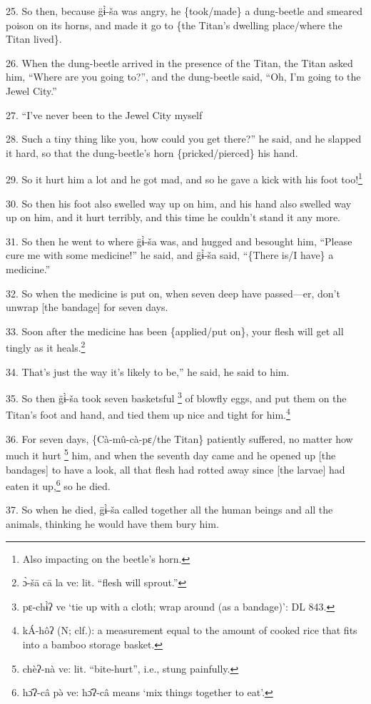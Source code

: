 25. So then, because g̈ɨ̀-ša was angry, he \{took/made\} a dung-beetle and
smeared poison on its horns, and made it go to \{the Titan's dwelling place/where
the Titan lived\}.

26. When the dung-beetle arrived in the presence of the Titan, the Titan asked
him, ``Where are you going to?'', and the dung-beetle said, ``Oh, I'm going to
the Jewel City.''

27. ``I've never been to the Jewel City myself

28. Such a tiny thing like you, how could you get there?'' he said, and he slapped
it hard, so that the dung-beetle's horn \{pricked/pierced\} his hand.

29. So it hurt him a lot and he got mad, and so he gave a kick with his foot too!\footnote{Also impacting on the beetle's horn.}

30. So then his foot also swelled way up on him, and his hand also swelled way
up on him, and it hurt terribly, and this time he couldn't stand it any more.

31. So then he went to where g̈ɨ̀-ša was, and hugged and besought him, ``Please
cure me with some medicine!'' he said, and g̈ɨ̀-ša said, ``\{There is/I have\}
a medicine.''

32. So when the medicine is put on, when seven deep have passed---er, don't unwrap
[the bandage] for seven days.

33. Soon after the medicine has been \{applied/put on\}, your flesh will get all
tingly as it heals.\footnote{ɔ̀-šā cā la ve: lit. ``flesh will sprout.''}

34. That's just the way it's likely to be,'' he said, he said to him.

35. So then g̈ɨ̀-ša took seven basketsful \footnote{pɛ-chɨ̀ʔ ve `tie up with a cloth; wrap around (as a bandage)': DL 843.} of blowfly eggs, and put them
on the Titan's foot and hand, and tied them up nice and tight for him.\footnote{kÁ-hôʔ (N; clf.): a measurement equal to the amount of cooked rice that fits into a bamboo storage basket.}

36. For seven days, \{Cà-mû-cà-pɛ/the Titan\} patiently suffered, no matter
how much it hurt \footnote{chèʔ-nà ve: lit. ``bite-hurt'', i.e., stung painfully.} him, and when the seventh day came and he opened up [the
bandages] to have a look, all that flesh had rotted away since [the larvae] had
eaten it up,\footnote{hɔ̂ʔ-câ pə̀ ve: hɔ̂ʔ-câ means `mix things together to eat'.} so he died.

37. So when he died, g̈ɨ̀-ša called together all the human beings and all the
animals, thinking he would have them bury him.

